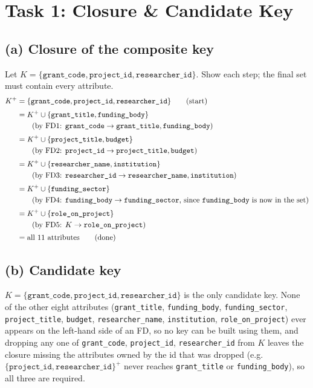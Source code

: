 \documentclass[11pt, letterpaper]{article}
\newcommand{\attr}[1]{\texttt{#1}}
\newcommand{\fd}{\ensuremath{\rightarrow}}
\begin{document}
\section{Task 1: Closure \& Candidate Key}

\subsection*{(a) Closure of the composite key}
Let \(K = \{\attr{grant\_code}, \attr{project\_id}, \attr{researcher\_id}\}\). Show each step; the final set must contain every attribute.
\[
\begin{aligned}
K^{+} &= \{\attr{grant\_code}, \attr{project\_id}, \attr{researcher\_id}\} \qquad \text{(start)}\\[2pt]
      &= K^{+} \cup \{\attr{grant\_title}, \attr{funding\_body}\}\\
      &\qquad \text{(by FD1: } \attr{grant\_code} \fd \attr{grant\_title}, \attr{funding\_body}\text{)}\\[2pt]
      &= K^{+} \cup \{\attr{project\_title}, \attr{budget}\}\\
      &\qquad \text{(by FD2: } \attr{project\_id} \fd \attr{project\_title}, \attr{budget}\text{)}\\[2pt]
      &= K^{+} \cup \{\attr{researcher\_name}, \attr{institution}\}\\
      &\qquad \text{(by FD3: } \attr{researcher\_id} \fd \attr{researcher\_name}, \attr{institution}\text{)}\\[2pt]
      &= K^{+} \cup \{\attr{funding\_sector}\}\\
      &\qquad \text{(by FD4: } \attr{funding\_body} \fd \attr{funding\_sector}\text{, since \attr{funding\_body} is now in the set)}\\[2pt]
      &= K^{+} \cup \{\attr{role\_on\_project}\}\\
      &\qquad \text{(by FD5: } K \fd \attr{role\_on\_project}\text{)}\\[2pt]
      &= \text{all 11 attributes} \qquad \text{(done)}
\end{aligned}
\]

\subsection*{(b) Candidate key}
$K = \{\attr{grant\_code}, \attr{project\_id}, \attr{researcher\_id}\}$ is the only candidate key. None of the other eight attributes (\attr{grant\_title}, \attr{funding\_body}, \attr{funding\_sector}, \attr{project\_title}, \attr{budget}, \attr{researcher\_name}, \attr{institution}, \attr{role\_on\_project}) ever appears on the left-hand side of an FD, so no key can be built using them, and dropping any one of \attr{grant\_code}, \attr{project\_id}, \attr{researcher\_id} from $K$ leaves the closure missing the attributes owned by the id that was dropped (e.g.\ $\{\attr{project\_id}, \attr{researcher\_id}\}^{+}$ never reaches \attr{grant\_title} or \attr{funding\_body}), so all three are required.
\end{document}

